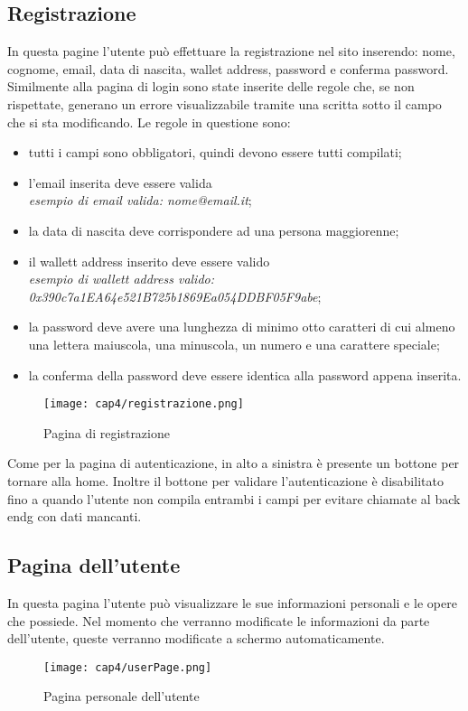 \subsection{Registrazione}
In questa pagine l'utente può effettuare la registrazione nel sito inserendo: nome, cognome, email, data di nascita, wallet address, password e conferma password. Similmente alla pagina di login sono state inserite delle regole che, se non rispettate, generano un errore visualizzabile tramite una scritta sotto il campo che si sta modificando. Le regole in questione sono:
\begin{itemize}
	\item tutti i campi sono obbligatori, quindi devono essere tutti compilati;
	\item l'email inserita deve essere valida\\
	\textit{esempio di email valida: nome@email.it};
	\item la data di nascita deve corrispondere ad una persona maggiorenne;
	\item il wallett address inserito deve essere valido\\ 
	\textit{esempio di wallett address valido: 0x390c7a1EA64e521B725b1869Ea054DDBF05F9abe};
	\item la password deve avere una lunghezza di minimo otto caratteri di cui almeno una lettera maiuscola, una minuscola, un numero e una carattere speciale;
	\item la conferma della password deve essere identica alla password appena inserita.
\end{itemize}
\begin{figure}[H]
	\begin{center}
		\texttt{[image: cap4/registrazione.png]}
		\caption{Pagina di registrazione}
	\end{center}
\end{figure}
Come per la pagina di autenticazione, in alto a sinistra è presente un bottone per tornare alla home. Inoltre il bottone per validare l'autenticazione è disabilitato fino a quando l'utente non compila entrambi i campi per evitare chiamate al \gls{back endg} con dati mancanti.
\subsection{Pagina dell'utente}
In questa pagina l'utente può visualizzare le sue informazioni personali e le opere che possiede. Nel momento che verranno modificate le informazioni da parte dell'utente, queste verranno modificate a schermo automaticamente.
\begin{figure}[H]
	\begin{center}
		\texttt{[image: cap4/userPage.png]}
		\caption{Pagina personale dell'utente}
	\end{center}
\end{figure}
